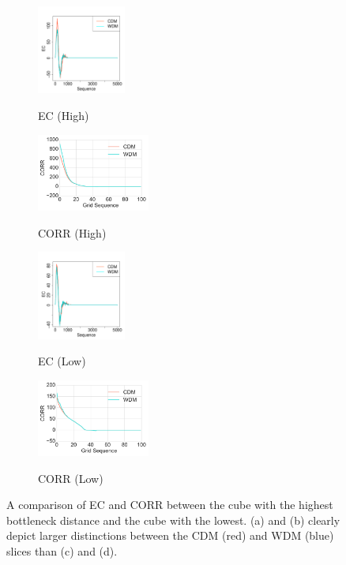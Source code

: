 \documentclass[12pt]{article}
\begin{document}
\begin{figure}[htp!]
  \centering
    \begin{subfigure}{0.24\textwidth}
    \centering
        \caption{EC (High)}
\includegraphics[width = 1.15in]{figure_13_max_margin_2euler.pdf}
    \label{fig:valid1}
  \end{subfigure}
    \begin{subfigure}{0.24\textwidth}
    \centering
        \caption{CORR (High)}
\includegraphics[width = 1.46in]{figure_13_max_margin_corr.pdf}
    \label{fig:valid2}
  \end{subfigure}
    \begin{subfigure}{0.24\textwidth}
    \centering
        \caption{EC (Low)}
\includegraphics[width = 1.15in]{figure_13_min_margin_2euler.pdf}
    \label{fig:valid3}
  \end{subfigure}
    \begin{subfigure}{0.24\textwidth}
    \centering
        \caption{CORR (Low)}
\includegraphics[width = 1.46in]{figure_13_min_margin_corr.pdf}
    \label{fig:valid4}
  \end{subfigure}
    \caption{A comparison of EC and CORR between the cube with the highest bottleneck distance and the cube with the lowest. (a) and (b) clearly depict larger distinctions between the CDM (red) and WDM (blue) slices than (c) and (d).}
    \label{fig:validationfigs}
\end{figure}
\end{document}
